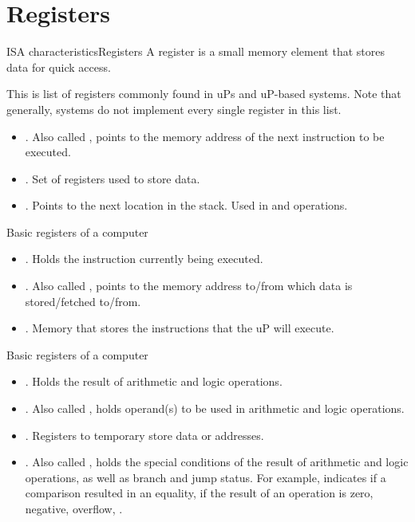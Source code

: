 \section{Registers}
\begin{frame}{\acs{ISA} characteristics}{Registers}
A register is a small memory element that stores data for quick access.

This is list of registers commonly found in \acp{uP} and \ac{uP}-based systems.
Note that generally, systems do not implement every single register in this list.
  \begin{itemize}
    \item {}. Also called , points to the memory address of the next instruction to be executed.
    \item {}. Set of registers used to store data. 
    \item {}. Points to the next location in the stack. Used in  and  operations.
    \end{itemize}
\end{frame}

\begin{frame}{Basic registers of a computer}{}
  \begin{itemize}
      \item {}. Holds the instruction currently being executed.
    \item {}. Also called , points to the memory address to/from which data is stored/fetched to/from.
    \item {}. Memory that stores the instructions that the \ac{uP} will execute.
    \end{itemize}
\end{frame}

\begin{frame}{Basic registers of a computer}{}
  \begin{itemize}
    \item {}. Holds the result of arithmetic and logic operations.
    \item {}. Also called , holds operand(s) to be used in arithmetic and logic operations.
    \item {}. Registers to temporary store data or addresses.
    \item {}. Also called , holds the special conditions of the result of arithmetic and logic operations, as well as branch and jump status. For example, indicates if a comparison resulted in an equality, if the result of an operation is zero, negative, overflow, \etc.
    \end{itemize}
\end{frame}

